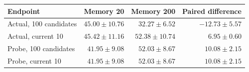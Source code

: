 \begin{tabular}{lrrr}
\toprule
Endpoint & Memory 20 & Memory 200 & Paired difference \\
\midrule
Actual, 100 candidates & $45.00 \pm 10.76$ & $32.27 \pm 6.52$ & $-12.73 \pm 5.57$ \\
Actual, current 10 & $45.42 \pm 11.16$ & $52.38 \pm 10.74$ & $6.95 \pm 0.60$ \\
Probe, 100 candidates & $41.95 \pm 9.08$ & $52.03 \pm 8.67$ & $10.08 \pm 2.15$ \\
Probe, current 10 & $41.95 \pm 9.08$ & $52.03 \pm 8.67$ & $10.08 \pm 2.15$ \\
\bottomrule
\end{tabular}
